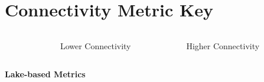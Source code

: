\documentclass[bigger]{beamer}
\begin{document}

\section{Connectivity Metric Key}
\begin{frame}
  \begin{center}

    \begin{columns}[b]     
      \begin{column}{0.4\textwidth}        
      \end{column}
  
      \begin{column}{0.25\textwidth}
        \huge{Lower Connectivity}
      \end{column}
    
      \begin{column}{0.25\textwidth}
        \huge{Higher Connectivity}
      \end{column}
   \end{columns}

  \begin{columns}    
    \begin{column}[b]{0.4\textwidth}
      \vspace{2em}
    \end{column}

  \begin{column}[b]{0.25\textwidth}
  \end{column}
  
  \begin{column}[b]{0.25\textwidth}
  \end{column}
  \end{columns}

  \begin{columns}[T]    
    \begin{column}{0.4\textwidth}
      {\fontsize{65}{65}\textbf{Lake-based Metrics}}
      \vspace{3em}
    \end{column}

  \begin{column}{0.25\textwidth}
  \end{column}
  
  \begin{column}{0.25\textwidth}
  \end{column}
  \end{columns}
  

\end{center}
\end{frame}
\end{document}
